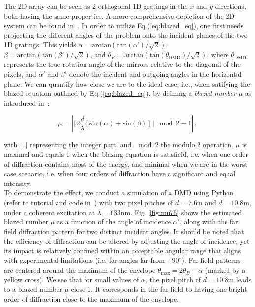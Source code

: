 \documentclass[12pt]{iopart}
\begin{document}
The 2D array can be seen as 2 orthogonal 1D gratings in the $x$ and $y$ directions,
both having the same properties.
A more comprehensive depiction of the 2D system can be found in~\cite{Scholes2019structured}.
In order to utilize Eq.(\ref{eq:blazed_eq}),
one first needs projecting
the different angles of the problem onto the incident planes
of the two 1D gratings.
This yields
$\alpha = \text{arctan}\left(\text{tan}(\alpha')/\sqrt{2}\right)$,
$\beta = \text{arctan}\left(\text{tan}(\beta')/\sqrt{2}\right)$,
and $\theta_B = \text{arctan}\left(\text{tan}(\theta_\text{DMD})/\sqrt{2}\right)$,
where $\theta_\text{DMD}$ represents the true rotation angle of the mirrors relative to the diagonal of the pixels,
and $\alpha'$ and $\beta'$ denote the incident and outgoing angles in the horizontal plane.
We can quantify how close we are to the ideal case,
i.e., when satifying the blazed equation outlined by Eq.(\ref{eq:blazed_eq}),
by defining a {\em blazed number} $\mu$ as introduced in~\cite{WFSnet_diffraction}:



\begin{equation}
  \mu =
  \left|
  \lfloor 2 \frac{d}{\lambda}
  \left[
    \text{sin}(\alpha)  +\text{sin}(\beta)
    \right]
  \rfloor
  \mod{2} -1
  \right| \, ,
  \label{eq:blazed_number}
\end{equation}

with $\lfloor . \rfloor$ representing the integer part,
and $\mod{2}$ the modulo 2 operation.
$\mu$ is maximal and equals $1$ when the blazing equation is satisfield,
i.e. when one order of diffraction contains most of the energy,
and minimal when we are in the worst case scenario,
i.e. when four orders of diffraction have a significant and equal intensity.\\


To demonstrate the effect, we conduct a simulation of a DMD using Python
(refer to tutorial and code in~\cite{WFSnet_diffraction})
with two pixel pitches of
$d=7.6$\textmu m and $d=10.8$\textmu m,
under a coherent excitation at $\lambda=633$nm.
Fig.~\ref{fig:mu76} shows the estimated blazed number $\mu$
as a function of the angle of incidence $\alpha'$,
along with the far field diffraction pattern for two distinct incident angles.
It should be noted that the efficiency of diffraction can be altered by adjusting
the angle of incidence, yet its impact is relatively confined
within an acceptable angular range that aligns with experimental limitations
(i.e. for angles far from $\pm 90^\circ$).
Far field patterns are centered around the maximum of the envelope
$\theta_\text{max} = 2\theta_B - \alpha$
(marked by a yellow cross).
We see that for small values of $\alpha$,
the pixel pitch of $d=10.8$\textmu m leads to a blazed number $\mu$
close $1$.
It corresponds in the far field to having one bright order of diffraction
close to the maximum of the envelope.
\end{document}
